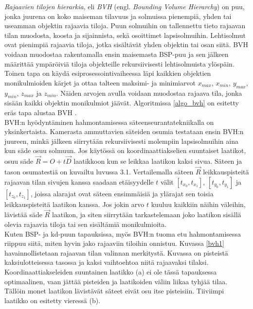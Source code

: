 \documentclass[a4paper, 12pt, titlepage]{article}
\begin{document}
\emph{Rajaavien tilojen hierarkia}, eli \emph{BVH} (engl. \emph{Bounding Volume Hierarchy}) on puu, jonka juurena on koko maiseman tilavuus ja solmuissa pienempiä, yhden tai useamman objektin rajaavia tiloja. Puun solmuihin on tallennettu tieto rajaavan tilan muodosta, koosta ja sijainnista, sekä osoittimet lapsisolmuihin. Lehtisolmut ovat pienimpiä rajaavia tiloja, jotka sisältävät yhden objektin tai osan siitä. BVH voidaan muodostaa rakentamalla ensin maisemasta BSP-puu ja sen jälkeen määrittää ympäröiviä tiloja objekteille rekursiivisesti lehtisolmuista ylöspäin. \citep{hughes} Toinen tapa on käydä esiprosessointivaiheessa läpi kaikkien objektien monikulmioiden kärjet ja ottaa talteen maksimi- ja minimiarvot $x_{max}$, $x_{min}$, $y_{max}$, $y_{min}$, $z_{max}$ ja $z_{min}$. Näiden arvojen avulla voidaan muodostaa rajaava tila, jonka sisään kaikki objektin monikulmiot jäävät. \citep[.]{janke} Algoritmissa \ref{algo_bvh} on esitetty eräs tapa alustaa BVH \citep{thrane}.\\



BVH:n hyödyntäminen hahmontamisessa säteenseurantatekniikalla on yksinkertaista. Kamerasta ammuttavien säteiden osumia testataan ensin BVH:n juureen, minkä jälkeen siirrytään rekursiivisesti molempiin lapsisolmuihin aina kun säde osuu solmuun. Jos käytössä on koordinaattiakselien suuntaiset laatikot, osuu säde $\vec{R}=O+t\vec{D}$ laatikkoon kun se leikkaa laatikon kaksi sivua. Säteen ja tason osumatestiä on kuvailtu luvussa 3.1. Vertailemalla säteen $\vec{R}$ leikkauspisteitä rajaavan tilan sivujen kanssa saadaan etäisyydelle $t$ välit $[t_{x_0}, t_{x_1}]$, $[t_{y_0}, t_{y_1}]$ ja $[t_{z_0}, t_{z_1}]$, joissa alarajat ovat säteen ensimmäisiä ja ylärajat sen toisia leikkauspisteitä laatikon kanssa. Jos jokin arvo $t$ kuuluu kaikkiin näihin väleihin, lävistää säde $\vec{R}$ laatikon, ja siten siirrytään tarkastelemaan joko laatikon sisällä olevia rajaavia tiloja tai sen sisältämiä monikulmioita. \citep[.]{janke}\\

Kuten BSP- ja kd-puun tapauksissa, myös BVH:n tuoma etu hahmontamisessa riippuu siitä, miten hyvin jako rajaaviin tiloihin onnistuu. Kuvassa \ref{bvh1} havainnollistetaan rajaavan tilan valinnan merkitystä. Kuvassa on pisteistä kaksiulotteisessa tasossa ja kaksi vaihtoehtoa niitä rajaavaksi tilaksi. Koordinaattiakseleiden suuntainen laatikko (a) ei ole tässä tapauksessa optimaalinen, vaan jättää pisteiden ja laatikoiden väliin liikaa tyhjää tilaa. Tällöin monet laatikon lävistävät säteet eivät osu itse pisteisiin. Tiiviimpi laatikko on esitetty vieressä (b).\\
\end{document}
